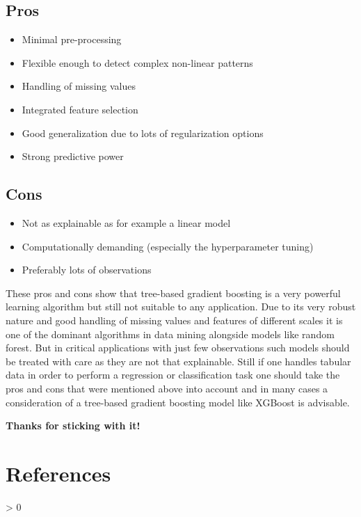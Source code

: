 \documentclass[
]{book}
\newlength{\cslhangindent}
\newenvironment{CSLReferences}[2] %
 {%
  \setlength{\parindent}{0pt}
  \ifodd #1 \everypar{\setlength{\hangindent}{\cslhangindent}}\ignorespaces\fi
  \ifnum #2 > 0
  \setlength{\parskip}{#2\baselineskip}
  \fi
 }%
 {}
\begin{document}
\hypertarget{pros}{%
\section{Pros}\label{pros}}

\begin{itemize}
\item
  Minimal pre-processing
\item
  Flexible enough to detect complex non-linear patterns
\item
  Handling of missing values
\item
  Integrated feature selection
\item
  Good generalization due to lots of regularization options
\item
  Strong predictive power
\end{itemize}

\hypertarget{cons}{%
\section{Cons}\label{cons}}

\begin{itemize}
\item
  Not as explainable as for example a linear model
\item
  Computationally demanding (especially the hyperparameter tuning)
\item
  Preferably lots of observations
\end{itemize}

These pros and cons show that tree-based gradient boosting is a very powerful learning algorithm but still not suitable to any application. Due to its very robust nature and good handling of missing values and features of different scales it is one of the dominant algorithms in data mining alongside models like random forest. But in critical applications with just few observations such models should be treated with care as they are not that explainable. Still if one handles tabular data in order to perform a regression or classification task one should take the pros and cons that were mentioned above into account and in many cases a consideration of a tree-based gradient boosting model like XGBoost is advisable.

\textbf{Thanks for sticking with it!}

\hypertarget{references}{%
\chapter{References}\label{references}}

\hypertarget{refs}{}
\begin{CSLReferences}{0}{0}
\end{CSLReferences}

  
\end{document}
